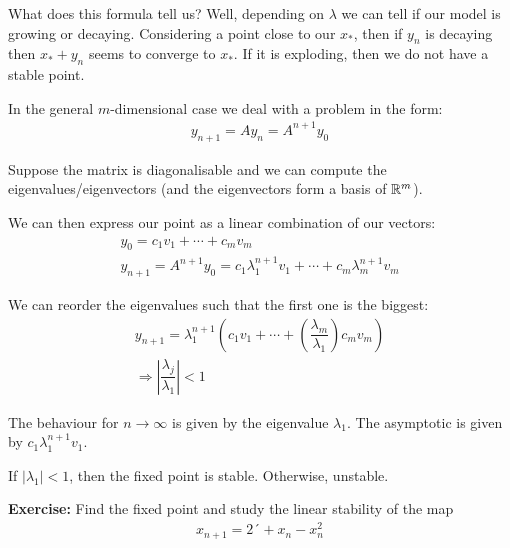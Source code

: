\par\bigskip
\noindent What does this formula tell us? Well, depending on $\lambda$ we can tell if our model is growing or decaying. Considering a point close to our $x_*$, then if $y_n$ is decaying then $x_*+y_n$ seems to converge to $x_*$. If it is exploding, then we do not have a stable point.
\par\bigskip
\noindent In the general $m$-dimensional case we deal with a problem in the form:
\begin{equation*}
  \begin{gathered}
    y_{n+1} = Ay_n = A^{n+1}y_0
  \end{gathered}
\end{equation*}\par
\noindent Suppose the matrix is diagonalisable and we can compute the eigenvalues/eigenvectors (and the eigenvectors form a basis of $\mathbb{R}^m$).\par
\noindent We can then express our point as a linear combination of our vectors:
\begin{equation*}
  \begin{gathered}
    y_0 = c_1v_1+\cdots+c_mv_m\\
    y_{n+1} = A^{n+1}y_0 = c_1\lambda_1^{n+1}v_1+\cdots+c_m\lambda_m^{n+1}v_m
  \end{gathered}
\end{equation*}\par
\noindent We can reorder the eigenvalues such that the first one is the biggest:
\begin{equation*}
  \begin{gathered}
    y_{n+1} = \lambda_1^{n+1}\left(c_1v_1+\cdots+\left(\dfrac{\lambda_m}{\lambda_1}\right)c_mv_m\right)\\
    \Rightarrow \left|\dfrac{\lambda_j}{\lambda_1}\right|<1
  \end{gathered}
\end{equation*}\par
\noindent The behaviour for $n\to\infty$ is given by the eigenvalue $\lambda_1$. The asymptotic is given by $c_1\lambda_1^{n+1}v_1$.
\par\bigskip
\noindent If $\left|\lambda_1\right|<1$, then the fixed point is stable. Otherwise, unstable.\par
\par\bigskip
\noindent\textbf{Exercise:} Find the fixed point and study the linear stability of the map 
\begin{equation*}
  \begin{gathered}
    x_{n+1} = 2´+x_n-x_n^2
  \end{gathered}
\end{equation*}\par
